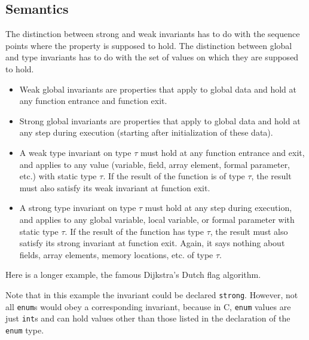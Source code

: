 \subsection{Semantics}

The distinction between strong and weak invariants has to do with the
sequence points where the property is supposed to hold. The distinction
between global and type invariants has to do with the set of values on
which they are supposed to hold.

\begin{itemize}
\item Weak global invariants are properties that apply to global
  data and hold at any function entrance and function exit.

\item Strong global invariants are properties that apply to global
  data and hold at any step during execution (starting after
  initialization of these data).

\item A weak type invariant on type $\tau$ must hold at any function
  entrance and exit, and applies to any value (variable, field, array element, formal
  parameter, etc.) with static type $\tau$. If the result of the
  function is of type $\tau$, the result must also satisfy its
  weak invariant at function exit. 

\item A strong type invariant on type $\tau$ must hold at any step
  during execution, and applies to any global variable, local
  variable, or formal parameter
  with static type $\tau$. If the
  result of the function has type $\tau$, the result must also
  satisfy its strong invariant at function exit. Again, it says
  nothing about fields, array elements, memory locations, etc. of type
  $\tau$.

\end{itemize}


\begin{example}

\end{example}

\begin{example}
  Here is a longer example, the famous Dijkstra's Dutch flag algorithm.\\
\end{example}
Note that in this example the invariant could be declared \lstinline|strong|. However, not all \lstinline|enum|s would 
obey a corresponding invariant, because in C, \lstinline|enum| values are just \lstinline|int|s and can hold values other
than those listed in the declaration of the \lstinline|enum| type.


